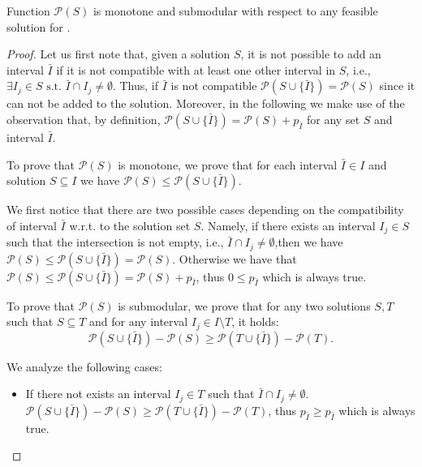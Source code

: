 \documentclass[11pt]{article} %
\begin{document}
\begin{theorem}
Function \(\mathcal{P}(S)\) is monotone and submodular with respect to any feasible solution for \prob.
\end{theorem}
\begin{proof}

Let us first note that, given a solution \(S\), it is not possible to add an interval \(\bar{I}\) if it is not compatible with at least one other interval in \(S\), i.e., \(\exists I_j \in S\text{ s.t. } \bar{I} \cap I_j \neq \emptyset\).
Thus, if \(\bar{I}\) is not compatible \(\mathcal{P}(S \cup \{\bar{I}\}) = \mathcal{P}(S)\) since it can not be added to the solution.
Moreover, in the following we make use of the observation that, by definition, \(\mathcal{P}(S\cup\{\bar{I}\}) = \mathcal{P}(S) + p_{\bar{I}}\) for any set \(S\) and interval \(\bar{I}\).


To prove that \(\mathcal{P}(S)\) is monotone, we prove that for each interval \(\bar{I}\in I\) and solution \(S \subseteq I\) we have 
\(
\mathcal{P}(S) \le \mathcal{P}(S \cup \{\bar{I}\})
\).


We first notice that there are two possible cases depending on the compatibility of interval \(\bar{I}\) w.r.t. to the solution set \(S\).
Namely, if there exists an interval \(I_j \in S\) such that the intersection is not empty, i.e., \(\bar{I} \cap I_j \neq \emptyset\),then we have
\( \mathcal{P}(S) \le \mathcal{P}(S \cup \{\bar{I}\}) = \mathcal{P}(S)\).
Otherwise we have that
\(
\mathcal{P}(S) \le \mathcal{P}(S \cup \{\bar{I}\}) = \mathcal{P}(S) + p_{\bar{I}}
\), thus \(0 \le p_{\bar{I}}\) which is always true.


To prove that \(\mathcal{P}(S)\) is submodular, we prove that for any two solutions \(S,T\) such that \(S\subseteq T\) and for any interval \(I_j \in I\setminus T\), it holds:
\[
 \mathcal{P}(S\cup\{\bar{I}\}) - \mathcal{P}(S) \geq \mathcal{P}(T\cup \{\bar{I}\}) - \mathcal{P}(T).
\]

We analyze the following cases:
\begin{itemize}
\item If there not exists an interval \(I_j \in T\) such that \(\bar{I} \cap I_j \neq \emptyset\). 
\(
\mathcal{P}(S\cup\{\bar{I}\}) - \mathcal{P}(S) \geq \mathcal{P}(T\cup \{\bar{I}\}) - \mathcal{P}(T)
\), thus \(p_{\bar{I}} \geq p_{\bar{I}}\) which is always true.


\end{itemize}
\end{proof}
\end{document}
